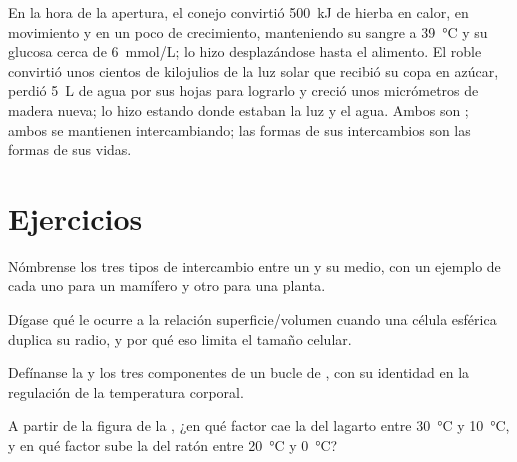 \begin{example}\label{ex:b1:organism-environment:budgets}
En la hora de la apertura, el conejo convirtió \qty{500}{kJ} de hierba en
calor, en movimiento y en un poco de crecimiento, manteniendo su sangre a
\qty{39}{\celsius} y su glucosa cerca de \qty{6}{mmol/L}; lo hizo
desplazándose hasta el alimento. El roble convirtió unos cientos de
kilojulios de la luz solar que recibió su copa en azúcar, perdió \qty{5}{L}
de agua por sus hojas para lograrlo y creció unos micrómetros de madera
nueva; lo hizo estando donde estaban la luz y el agua. Ambos son ; ambos se mantienen intercambiando; las formas de sus intercambios
son las formas de sus vidas.
\end{example}

\section{Ejercicios}

\begin{exercise}[$\star$]\label{exo:b1:organism-environment:1}
Nómbrense los tres tipos de intercambio entre un  y su medio, con
un ejemplo de cada uno para un mamífero y otro para una planta.
\end{exercise}

\begin{exercise}[$\star$]\label{exo:b1:organism-environment:2}
Dígase qué le ocurre a la relación superficie/volumen cuando una célula
esférica duplica su radio, y por qué eso limita el tamaño celular.
\end{exercise}

\begin{exercise}[$\star$]\label{exo:b1:organism-environment:3}
Defínanse la  y los tres componentes de un bucle de
, con su identidad en la regulación de la
temperatura corporal.
\end{exercise}

\begin{exercise}[$\star$]\label{exo:b1:organism-environment:4}
A partir de la figura de la , ¿en qué factor cae la  del lagarto entre \qty{30}{\celsius} y \qty{10}{\celsius}, y en
qué factor sube la del ratón entre \qty{20}{\celsius} y
\qty{0}{\celsius}?
\end{exercise}


